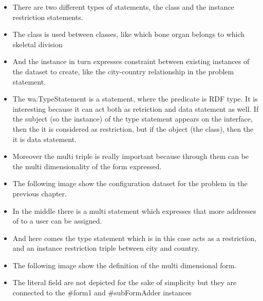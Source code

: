 
\begin{itemize}
	\item There are two different types of statements, the class and the instance restriction statements. 
	\item The class is used between classes, like which bone organ belongs to which skeletal division
	\item And the instance in turn expresses constraint between existing instances of the dataset to create, like the city-country relationship in the problem statement.
	\item The wa:TypeStatement is a statement, where the predicate is RDF type. It is interesting because it can act both as retriction and data statement as well. If the subject (so the instance) of the type statement appears on the interface, then
	the it is considered as restriction, but if the object (the class), then the it is data statement.
	\item Moreover the multi triple is really important because through them can be the multi dimensionality of the form expressed.
\end{itemize}


\begin{itemize}
	\item	The following image show the configuration dataset for the problem in the previous chapter.
	\item In the middle there is a multi statement which expresses that more addresses of to a user can be assigned.
\end{itemize}



\begin{itemize}
	\item	And here comes the type statement which is in this case acts as a restriction, and an instance restriction triple between city and country.
\end{itemize}


\begin{itemize}
	\item	The following image show the definition of the multi dimensional form.  
	\item The literal field are not depicted for the sake of simplicity but they are connected to the \#form1 and \#subFormAdder instances
\end{itemize}

